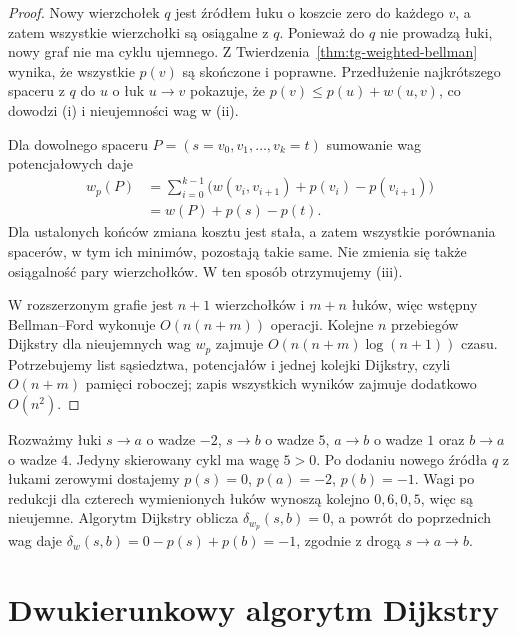 \begin{proof}
Nowy wierzchołek $q$ jest
źródłem łuku o koszcie zero
do każdego $v$, a zatem
wszystkie wierzchołki są
osiągalne z $q$.
Ponieważ do $q$ nie prowadzą
łuki, nowy graf nie ma
cyklu ujemnego. Z
Twierdzenia~\ref{thm:tg-weighted-bellman}
wynika, że wszystkie $p(v)$
są skończone i poprawne.
Przedłużenie najkrótszego
spaceru z $q$ do $u$
o łuk $u\to v$ pokazuje,
że $p(v)\le p(u)+w(u,v)$,
co dowodzi (i) i nieujemności
wag w (ii).

Dla dowolnego spaceru
$P=(s=v_0,v_1,\ldots,v_k=t)$
sumowanie wag potencjałowych daje
\[
\begin{aligned}
w_p(P)
&=\sum_{i=0}^{k-1}
\bigl(w(v_i,v_{i+1})
+p(v_i)-p(v_{i+1})\bigr)\\
&=w(P)+p(s)-p(t).
\end{aligned}
\]
Dla ustalonych końców
zmiana kosztu jest stała,
a zatem wszystkie porównania
spacerów, w tym ich minimów,
pozostają takie same.
Nie zmienia się także
osiągalność pary wierzchołków.
W ten sposób otrzymujemy (iii).

W rozszerzonym grafie jest
$n+1$ wierzchołków i $m+n$
łuków, więc wstępny
Bellman--Ford wykonuje
$O(n(n+m))$ operacji.
Kolejne $n$ przebiegów
Dijkstry dla nieujemnych wag
$w_p$ zajmuje
$O(n(n+m)\log(n+1))$ czasu.
Potrzebujemy list sąsiedztwa,
potencjałów i jednej
kolejki Dijkstry, czyli
$O(n+m)$ pamięci roboczej;
zapis wszystkich wyników
zajmuje dodatkowo $O(n^2)$.
\end{proof}

\begin{przyklad}
\label{ex:tg-weighted-johnson}
Rozważmy łuki $s\to a$ o wadze $-2$,
$s\to b$ o wadze $5$,
$a\to b$ o wadze $1$
oraz $b\to a$ o wadze $4$.
Jedyny skierowany cykl ma wagę $5>0$.
Po dodaniu nowego źródła $q$
z łukami zerowymi dostajemy
$p(s)=0$, $p(a)=-2$, $p(b)=-1$.
Wagi po redukcji dla
czterech wymienionych łuków
wynoszą kolejno $0,6,0,5$,
więc są nieujemne.
Algorytm Dijkstry oblicza
$\delta_{w_p}(s,b)=0$, a
powrót do poprzednich wag daje
$\delta_w(s,b)=0-p(s)+p(b)=-1$,
zgodnie z drogą $s\to a\to b$.
\end{przyklad}

\section{Dwukierunkowy algorytm Dijkstry}
\label{sec:tg-weighted-bidir}

